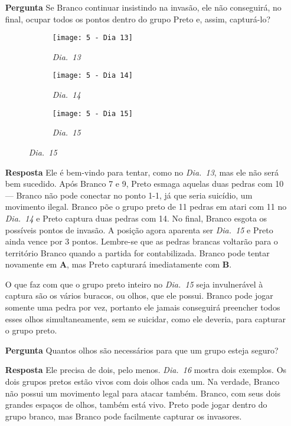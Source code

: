 \begin{itemize}
    \item[\textbf{Pergunta}]
      Se Branco continuar insistindo na invasão, ele não conseguirá, no final, ocupar todos os pontos dentro do grupo Preto e, assim, capturá-lo?

    \begin{figure}[h!]
      \centering
      \begin{subfigure}[t]{.3\textwidth}
          \centering
          \texttt{[image: 5 - Dia 13]}
          \caption*{\emph{Dia.\@~13}}
      \end{subfigure}
      \hfill
      \begin{subfigure}[t]{.3\textwidth}
          \centering
          \texttt{[image: 5 - Dia 14]}
          \caption*{\emph{Dia.\@~14}}
      \end{subfigure}
      \hfill
      \begin{subfigure}[t]{.3\textwidth}
        \centering
        \texttt{[image: 5 - Dia 15]}
        \caption*{\emph{Dia.\@~15}}
      \end{subfigure}
    \end{figure}

    \item[\textbf{Resposta}] 
      Ele é bem-vindo para tentar, como no \emph{Dia.\@~13}, mas ele não será bem sucedido. Após Branco 7 e 9, Preto esmaga aquelas duas pedras com 10 --- Branco não pode conectar no ponto 1-1, já que seria suicídio, um movimento ilegal. Branco põe o grupo preto de 11 pedras em atari com 11 no \emph{Dia.\@~14} e Preto captura duas pedras com 14. No final, Branco esgota os possíveis pontos de invasão. A posição agora aparenta ser \emph{Dia.\@~15} e Preto ainda vence por 3 pontos. Lembre-se que as pedras brancas voltarão para o território Branco quando a partida for contabilizada. Branco pode tentar novamente em \textbf{A}, mas Preto capturará imediatamente com \textbf{B}.
      
      O que faz com que o grupo preto inteiro no \emph{Dia.\@~15} seja invulnerável à captura são os vários buracos, ou olhos, que ele possui. Branco pode jogar somente uma pedra por vez, portanto ele jamais conseguirá preencher todos esses olhos simultaneamente, sem se suicidar, como ele deveria, para capturar o grupo preto.
    \item[\textbf{Pergunta}]
      Quantos olhos são necessários para que um grupo esteja seguro?
    \item[\textbf{Resposta}] 
      Ele precisa de dois, pelo menos. \emph{Dia.\@~16} mostra dois exemplos. Os dois grupos pretos estão vivos com dois olhos cada um. Na verdade, Branco não possui um movimento legal para atacar também. Branco, com seus dois grandes espaços de olhos, também está vivo. Preto pode jogar dentro do grupo branco, mas Branco pode facilmente capturar os invasores.


\end{itemize}
